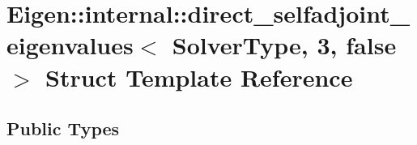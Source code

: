 \hypertarget{struct_eigen_1_1internal_1_1direct__selfadjoint__eigenvalues_3_01_solver_type_00_013_00_01false_01_4}{}\section{Eigen\+:\+:internal\+:\+:direct\+\_\+selfadjoint\+\_\+eigenvalues$<$ Solver\+Type, 3, false $>$ Struct Template Reference}
\label{struct_eigen_1_1internal_1_1direct__selfadjoint__eigenvalues_3_01_solver_type_00_013_00_01false_01_4}
\subsection*{Public Types}
